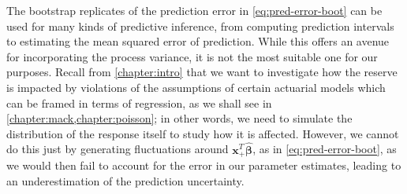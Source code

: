 \documentclass[a4paper]{book}
\begin{document}
The bootstrap replicates of the prediction error in \cref{eq:pred-error-boot} can be used for many kinds of predictive inference, from computing prediction intervals to estimating the mean squared error of prediction. While this offers an avenue for incorporating the process variance, it is not the most suitable one for our purposes. Recall from \cref{chapter:intro} that we want to investigate how the reserve is impacted by violations of the assumptions of certain actuarial models which can be framed in terms of regression, as we shall see in \cref{chapter:mack,chapter:poisson}; in other words, we need to simulate the distribution of the response itself to study how it is affected. However, we cannot do this just by generating fluctuations around $\mathbf{x}^T_+ \widehat{\bm{\beta}}$, as in \cref{eq:pred-error-boot}, as we would then fail to account for the error in our parameter estimates, leading to an underestimation of the prediction uncertainty. 
\end{document}
